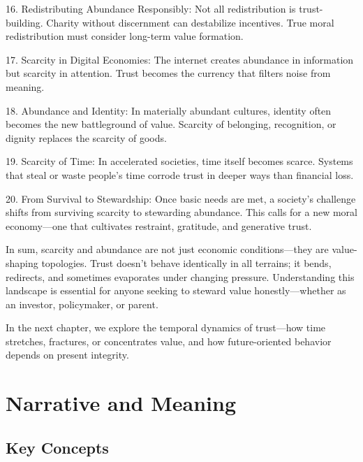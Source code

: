 \documentclass[11pt,oneside]{book}
\begin{document}
16. Redistributing Abundance Responsibly: Not all redistribution is trust-building. Charity without discernment can destabilize incentives. True moral redistribution must consider long-term value formation.



17. Scarcity in Digital Economies: The internet creates abundance in information but scarcity in attention. Trust becomes the currency that filters noise from meaning.



18. Abundance and Identity: In materially abundant cultures, identity often becomes the new battleground of value. Scarcity of belonging, recognition, or dignity replaces the scarcity of goods.



19. Scarcity of Time: In accelerated societies, time itself becomes scarce. Systems that steal or waste people’s time corrode trust in deeper ways than financial loss.



20. From Survival to Stewardship: Once basic needs are met, a society's challenge shifts from surviving scarcity to stewarding abundance. This calls for a new moral economy—one that cultivates restraint, gratitude, and generative trust.


In sum, scarcity and abundance are not just economic conditions—they are value-shaping topologies. Trust doesn’t behave identically in all terrains; it bends, redirects, and sometimes evaporates under changing pressure. Understanding this landscape is essential for anyone seeking to steward value honestly—whether as an investor, policymaker, or parent.

In the next chapter, we explore the temporal dynamics of trust—how time stretches, fractures, or concentrates value, and how future-oriented behavior depends on present integrity.


\chapter{ Narrative and Meaning}

\section{Key Concepts}
\end{document}
